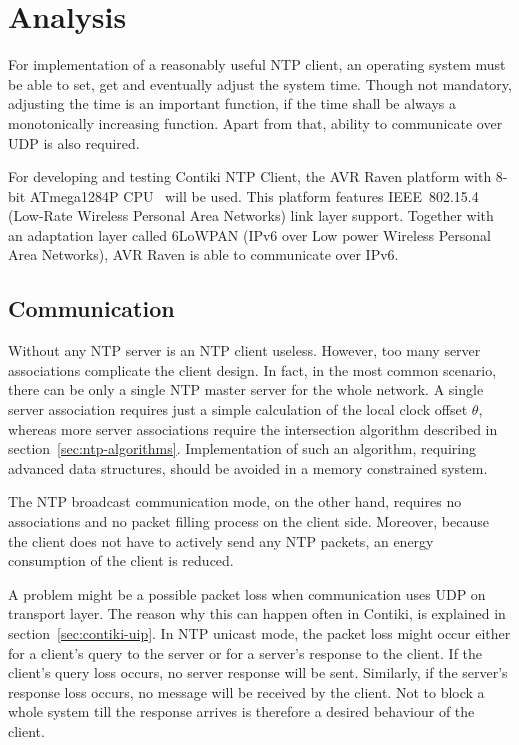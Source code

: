 
\chapter{Analysis}
For implementation of a reasonably useful NTP client,
an operating system must be able to set, get and eventually adjust the system time.
Though not mandatory, adjusting the time is an important function,
if the time shall be always a monotonically increasing function.
Apart from that, ability to communicate over UDP is also required.

For developing and testing Contiki NTP Client,
the AVR Raven platform with 8-bit ATmega1284P CPU~\cite{avr-datasheet} will be used.
This platform features IEEE~802.15.4 (Low-Rate Wireless Personal Area Networks) link layer support.
Together with an adaptation layer called 6LoWPAN (IPv6 over Low power Wireless Personal Area Networks),
AVR Raven is able to communicate over IPv6.






\section{Communication}
Without any NTP server is an NTP client useless. %
However, too many server associations complicate the client design.
In fact, in the most common scenario, there can be only a single NTP master server
for the whole network.
A single server association requires just a simple calculation of the local clock offset
$\theta$, whereas more server associations require the intersection algorithm
described in section~\ref{sec:ntp-algorithms}.
Implementation of such an algorithm, requiring advanced data structures, should be avoided
in a memory constrained system.

The NTP broadcast communication mode, on the other hand,
requires no associations and no packet filling process on the client side.
Moreover, because the client does not have to actively send any NTP packets,
an energy consumption of the client is reduced.

A problem might be a possible packet loss when communication uses UDP on transport layer.
The reason why this can happen often in Contiki, is explained in section~\ref{sec:contiki-uip}.
In NTP unicast mode, the packet loss might occur either for a client's query to the server
or for a server's response to the client.
If the client's query loss occurs, no server response will be sent.
Similarly, if the server's response loss occurs, no message will be received by the client.
Not to block a whole system till the response arrives
is therefore a desired behaviour of the client.

